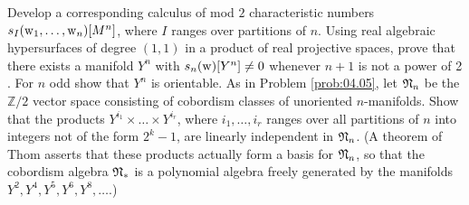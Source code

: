 \documentclass[../main]{subfiles}
\begin{document}
\begin{problem}\label{prob:16.F}
 Develop a corresponding calculus of mod $2$ characteristic numbers $s_{I}(\operatorname{w}_{1}, \ldots, \operatorname{w}_{n})[M^{n}]$, where $I$ ranges over partitions of $n$. Using real algebraic hypersurfaces of degree $(1,1)$ in a product of real projective spaces, prove that there exists a manifold $Y^{n}$ with $s_{n}(\operatorname{w})[Y^{n}]\neq 0$ whenever $n+1$ is not a power of 2 . For $n$ odd show that $Y^{n}$ is orientable. As in Problem \ref{prob:04.05}, let $\mathfrak{N}_n$ be the $\mathbb{Z} / 2$ vector space consisting of cobordism classes of unoriented $n$-manifolds. Show that the products $Y^{i_{1}} \times \ldots \times Y^{i_{r}}$, where $i_{1}, \ldots, i_{r}$ ranges over all partitions of $n$ into integers not of the form $2^{k}-1$, are linearly independent in $\mathfrak{N}_{n}$. (A theorem of Thom asserts that these products actually form a basis for $\mathfrak{N}_{n}$, so that the cobordism algebra $\mathfrak{N}_{*}$ is a polynomial algebra freely generated by the manifolds $Y^{2}, Y^{4}, Y^{5}, Y^{6}, Y^{8}, \ldots$.)
\end{problem}
\end{document}
